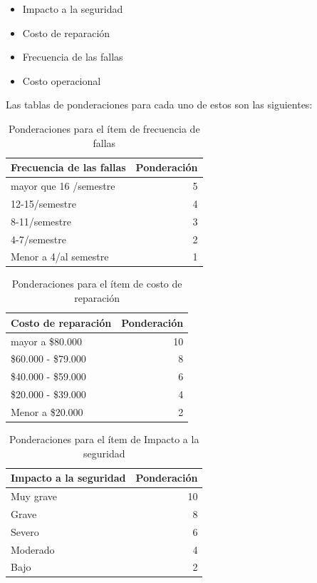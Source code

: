 \begin{itemize}
\item Impacto a la seguridad
\item Costo de reparación
\item Frecuencia de las fallas
\item Costo operacional
\end{itemize}

Las tablas de ponderaciones para cada uno de estos son las siguientes:

\begin{table}[H]
  \centering
  
    \begin{tabular}{|l|r|}
    \hline
    Frecuencia de las fallas & \multicolumn{1}{l|}{Ponderación} \\
    \hline
    mayor que 16 /semestre & 5 \\
    \hline
    12-15/semestre & 4 \\
    \hline
    8-11/semestre & 3 \\
    \hline
    4-7/semestre & 2 \\
    \hline
    Menor a 4/al semestre & 1 \\
    \hline
    \end{tabular}%
    \caption{Ponderaciones para el ítem de frecuencia de fallas}
  \label{tab:addlabel}%
\end{table}%

\qquad\qquad%

\begin{table}[H]
  \centering
 
    \begin{tabular}{|l|r|}
    \hline
    Costo de reparación & \multicolumn{1}{l|}{Ponderación} \\
    \hline
    mayor a \$80.000 & 10 \\
    \hline
    \$60.000 - \$79.000 & 8 \\
    \hline
    \$40.000 - \$59.000 & 6 \\
    \hline
    \$20.000 - \$39.000 & 4 \\
    \hline
    Menor a \$20.000 & 2 \\
    \hline
    \end{tabular}%
    \caption{Ponderaciones para el ítem de costo de reparación}
  \label{tab:addlabel}%
\end{table}%

\begin{table}[H]
  \centering
 
    \begin{tabular}{|l|r|}
    \hline
    Impacto a la seguridad & \multicolumn{1}{l|}{Ponderación} \\
    \hline
    Muy grave & 10 \\
    \hline
    Grave & 8 \\
    \hline
    Severo  & 6 \\
    \hline
    Moderado & 4 \\
    \hline
    Bajo  & 2 \\
    \hline
    \end{tabular}%
    \caption{Ponderaciones para el ítem de Impacto a la seguridad}
  \label{tab:addlabel}%
\end{table}%

